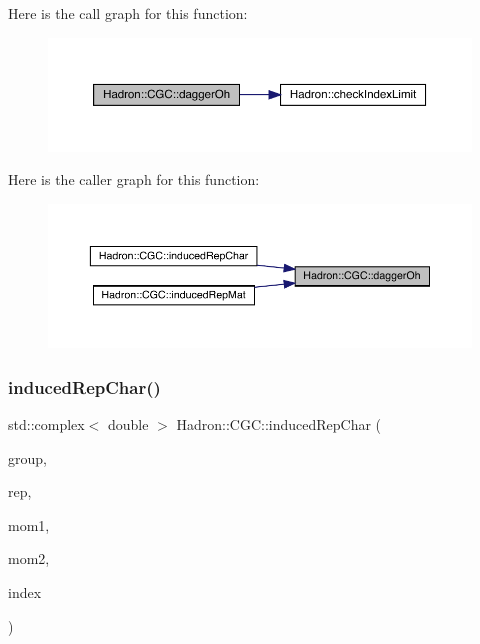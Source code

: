 Here is the call graph for this function\+:\nopagebreak
\begin{figure}[H]
\begin{center}
\leavevmode
\includegraphics[width=350pt]{d9/d19/namespaceHadron_1_1CGC_a90d3161b56ca289f2c3f62fa91923dac_cgraph}
\end{center}
\end{figure}
Here is the caller graph for this function\+:\nopagebreak
\begin{figure}[H]
\begin{center}
\leavevmode
\includegraphics[width=350pt]{d9/d19/namespaceHadron_1_1CGC_a90d3161b56ca289f2c3f62fa91923dac_icgraph}
\end{center}
\end{figure}
\mbox{\label{namespaceHadron_1_1CGC_a6508b0e362ceb9df82bdd26575736fc6}} 
\subsubsection{\texorpdfstring{inducedRepChar()}{inducedRepChar()}}
{\footnotesize\ttfamily std\+::complex$<$ double $>$ Hadron\+::\+C\+G\+C\+::induced\+Rep\+Char (\begin{DoxyParamCaption}\item[{\mbox{\hyperlink{classADAT_1_1Handle}{Handle}}$<$ \mbox{\hyperlink{structHadron_1_1LatticeGroup}{Lattice\+Group}} $>$}]{group,  }\item[{\mbox{\hyperlink{classADAT_1_1Handle}{Handle}}$<$ \mbox{\hyperlink{structHadron_1_1CubicRep}{Cubic\+Rep}} $>$}]{rep,  }\item[{const Array\+Int \&}]{mom1,  }\item[{const Array\+Int \&}]{mom2,  }\item[{int}]{index }\end{DoxyParamCaption})}

